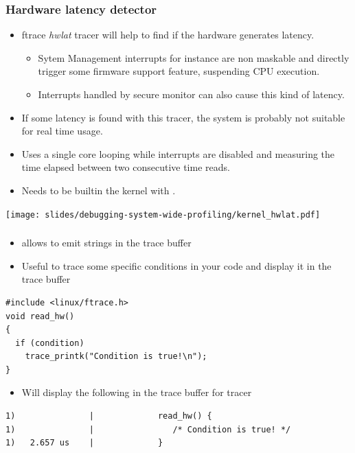\begin{frame}
  \frametitle{Hardware latency detector}
  \begin{itemize}
    \item ftrace {\em hwlat} tracer will help to find if the hardware generates
          latency.
    \begin{itemize}
      \item Sytem Management interrupts for instance are non maskable and
            directly trigger some firmware support feature, suspending CPU execution.
      \item Interrupts handled by secure monitor can also cause this kind of
            latency.
    \end{itemize}
    \item If some latency is found with this tracer, the system is probably
          not suitable for real time usage.
    \item Uses a single core looping while interrupts are disabled and measuring
          the time elapsed between two consecutive time reads.
    \item Needs to be builtin the kernel with .
  \end{itemize}

  \center\texttt{[image: slides/debugging-system-wide-profiling/kernel\_hwlat.pdf]}
\end{frame}

\begin{frame}[fragile]
  \frametitle{}
  \begin{itemize}
    \item {} allows to emit strings in the trace buffer
    \item Useful to trace some specific conditions in your code and display it in the trace buffer 
  \end{itemize}
  \begin{block}{}
    \begin{verbatim}
#include <linux/ftrace.h>
void read_hw()
{
  if (condition)
    trace_printk("Condition is true!\n");
}
    \end{verbatim}
  \end{block}
  \begin{itemize}
    \item Will display the following in the trace buffer for  tracer
  \end{itemize}
  \begin{block}{}
    \begin{verbatim}
1)               |             read_hw() {
1)               |                /* Condition is true! */
1)   2.657 us    |             }
    \end{verbatim}
  \end{block}
\end{frame}

